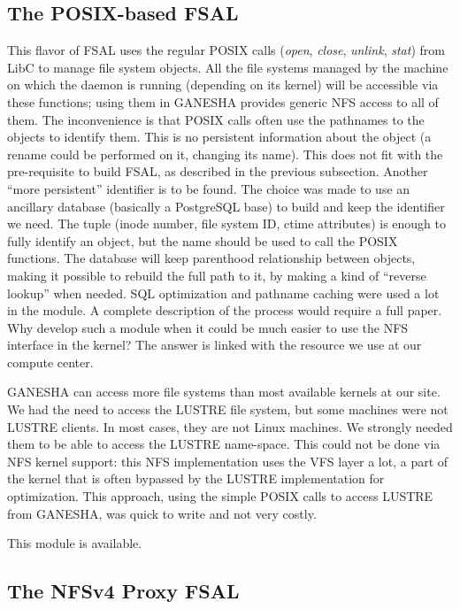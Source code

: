 \documentclass[final]{ols}
\begin{document}
\subsection{The POSIX-based FSAL}

This flavor of FSAL uses the regular POSIX calls (\textit{open}, 
\textit{close}, \textit{unlink}, \textit{stat}) from LibC to manage file
system objects. All the file systems managed by the machine on which
the daemon is running (depending on its kernel) will be accessible via
these functions; using them in GANESHA provides generic NFS access to
all of them.  The inconvenience is that POSIX calls often use the
pathnames to the objects to identify them. This is no persistent
information about the object (a rename could be performed on it,
changing its name). This does not fit with the pre-requisite to build
FSAL, as described in the previous subsection. Another ``more
persistent'' identifier is to be found.  The choice was made to use an
ancillary database (basically a PostgreSQL base) to build and keep the
identifier we need. The tuple (inode number, file system ID, ctime
attributes) is enough to fully identify an object, but the name should
be used to call the POSIX functions. The database will keep parenthood
relationship between objects, making it possible to rebuild the full
path to it, by making a kind of ``reverse lookup'' when needed. SQL
optimization and pathname caching were used a lot in the module. A complete
description of the process would require a full paper.  Why develop
such a module when it could be much easier to use the NFS interface in
the kernel?  The answer is linked with the resource we use at our compute
center.

GANESHA can access more file systems than most available kernels at our
site.  We had the need to access the LUSTRE file system, but some
machines were not LUSTRE clients. In most cases, they are not Linux
machines.  We strongly needed them to be able to access the LUSTRE
name-space. This could not be done via NFS kernel support: this NFS
implementation uses the VFS layer a lot, a part of the kernel that is
often bypassed by the LUSTRE implementation for optimization. This
approach, using the simple POSIX calls to access LUSTRE from GANESHA,
was quick to write and not very costly.

This module is available.

\subsection{The NFSv4 Proxy FSAL}
\end{document}
